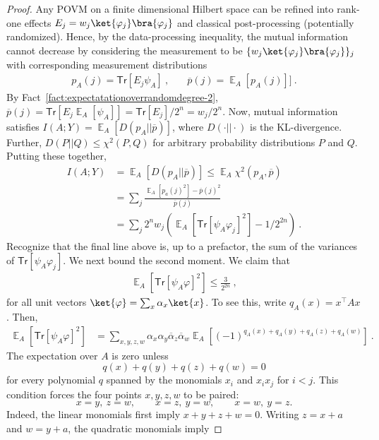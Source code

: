 \documentclass[11pt]{article}
\newcommand{\E}{\mathop{\mathbb{E}}}
\newcommand{\Tr}{\mathsf{Tr}}
\begin{document}
\begin{proof}
    Any POVM on a finite dimensional Hilbert space can be refined into rank-one effects $E_j = w_j \ket{\varphi_j}\bra{\varphi_j}$ and classical post-processing (potentially randomized). Hence, by the data-processing inequality, the mutual information cannot decrease by considering the measurement to be $\{w_j \ket{\varphi_j}\bra{\varphi_j}\}_j$ with corresponding measurement distributions 
    \begin{align}
        p_A(j) = \Tr[E_j \psi_A] \ , & \quad \overline{p}(j) = \E_A [p_A(j)]]\ .
    \end{align}
    By Fact~\ref{fact:expectatationoverrandomdegree-2}, $\overline{p}(j)   = \Tr[E_j \E_A[\psi_A]] = \Tr[E_j]/2^n = w_j/2^n$. 
  Now, mutual information satisfies $I(A;Y)  = \E_A[D(p_A \vert \vert \overline{p})]$, where $D(\cdot \vert \vert \cdot)$ is the KL-divergence. Further, $D(P\vert \vert Q) \leq \chi^2(P,Q)$ for arbitrary probability distributions $P$ and $Q$. Putting these together,
    \begin{align}
        I(A;Y) & = \E_A[D(p_A \vert \vert \overline{p})] \leq \E_A \chi^2(p_A,\overline{p})\\
        & = \sum_j \frac{\E_A[p_a(j)^2] - \overline{p}(j)^2}{\overline{p}(j)}\\
        & = \sum_j 2^n w_j (\E_A[\Tr[\psi_A \varphi_j]^2] - 1/2^{2n})\ .
    \end{align}
    Recognize that the final line above is, up to a prefactor, the sum of the variances of $\Tr[\psi_A \varphi_j]$. We next bound the second moment. We claim that
    \begin{align}
        \E_A[\Tr[\psi_A \varphi]^2] \leq \frac{3}{2^{2n}}\ ,
    \end{align}
    for all unit vectors $\ket{\varphi} = \sum_x \alpha_x \ket{x}$. To see this, write $q_A(x) = x^\top A x$. Then,
    \begin{align}
        \E_A[\Tr[\psi_A \varphi]^2] & = \sum_{x,y,z,w} \alpha_x \alpha_y \overline{\alpha}_z \overline{\alpha}_w \E_A\left[ (-1)^{q_A(x)+q_A(y)+q_A(z)+q_A(w)} \right]\ .
    \end{align}
The expectation over $A$ is zero unless
$$
    q(x)+q(y)+q(z)+q(w)=0
$$
for every polynomial $q$ spanned by the monomials $x_i$ and $x_ix_j$ for
$i<j$.  This condition forces the four points $x,y,z,w$ to be paired:
$$
    x=y,\ z=w,
    \qquad
    x=z,\ y=w,
    \qquad
    x=w,\ y=z.
$$
Indeed, the linear monomials first imply $x+y+z+w=0$.  Writing
$z=x+a$ and $w=y+a$, the quadratic monomials imply

\end{proof}
\end{document}
